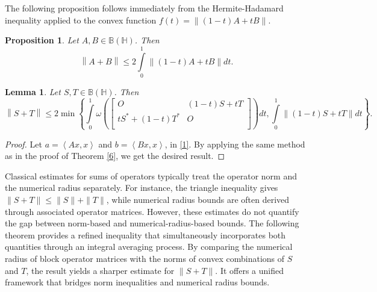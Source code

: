 \documentclass[12pt,twoside,reqno]{amsart}
\newtheorem{lemma}{Lemma}[section]
\newtheorem{proposition}{Proposition}[section]
\numberwithin{equation}{section}
\begin{document}
The following proposition follows immediately from the Hermite-Hadamard inequality applied to the convex function $f(t)=\left\| \left( 1-t \right)A+tB \right\|.$
\begin{proposition}
Let $A,B\in \mathbb B\left( \mathbb H \right)$. Then
\[\left\| A+B \right\|\le 2\int\limits_{0}^{1}{\left\| \left( 1-t \right)A+tB \right\|dt}.\]
\end{proposition}

\begin{lemma}\label{5}
Let $S,T\in \mathbb B\left( \mathbb H \right)$. Then
\[\left\| S+T \right\|\le 2\min \left\{ \int\limits_{0}^{1}{\omega \left( \left[ \begin{matrix}
   O & \left( 1-t \right)S+tT  \\
   t{{S}^{*}}+\left( 1-t \right){{T}^{*}} & O  \\
\end{matrix} \right] \right)dt},\int\limits_{0}^{1}{\left\| \left( 1-t \right)S+tT \right\|dt} \right\}.\]
\end{lemma}
\begin{proof}
Let $a=\left\langle Ax,x \right\rangle $ and $b=\left\langle Bx,x \right\rangle $, in \eqref{1}. By applying the same method as in the proof of Theorem \ref{6}, we get the desired result.
\end{proof}
Classical estimates for sums of operators typically treat the operator norm and the numerical radius separately. For instance, the triangle inequality gives $\|S+T\|\le \|S\|+\|T\|$, while numerical radius bounds are often derived through associated operator matrices. However, these estimates do not quantify the gap between norm-based and numerical-radius-based bounds. The following theorem provides a refined inequality that simultaneously incorporates both quantities through an integral averaging process. By comparing the numerical radius of block operator matrices with the norms of convex combinations of $S$ and $T$, the result yields a sharper estimate for $\|S+T\|$. It offers a unified framework that bridges norm inequalities and numerical radius bounds.
\end{document}
